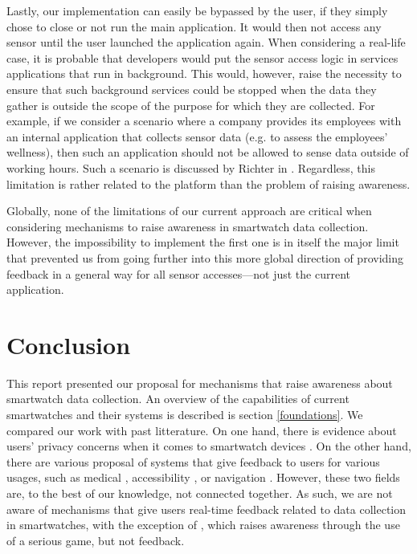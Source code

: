 \documentclass[conference, a4paper, 10pt, twocolumn]{IEEEtran}
\begin{document}
Lastly, our implementation can easily be bypassed by the user, if they simply chose to close or not run the main application. It would then not access any sensor until the user launched the application again. When considering a real-life case, it is probable that developers would put the sensor access logic in services applications that run in background. This would, however, raise the necessity to ensure that such background services could be stopped when the data they gather is outside the scope of the purpose for which they are collected. For example, if we consider a scenario where a company provides its employees with an internal application that collects sensor data (e.g. to assess the employees' wellness), then such an application should not be allowed to sense data outside of working hours. Such a scenario is discussed by Richter in \cite{richter2020privacy}. Regardless, this limitation is rather related to the platform than the problem of raising awareness. 

Globally, none of the limitations of our current approach are critical when considering mechanisms to raise awareness in smartwatch data collection. However, the impossibility to implement the first one is in itself the major limit that prevented us from going further into this more global direction of providing feedback in a general way for all sensor accesses---not just the current application.

\section{Conclusion}\label{conclusion}
This report presented our proposal for mechanisms that raise awareness about smartwatch data collection. An overview of the capabilities of current smartwatches and their systems is described is section \ref{foundations}. We compared our work with past litterature. On one hand, there is evidence about users' privacy concerns when it comes to smartwatch devices \cite{udoh2016privacy,datta2018survey,motti2015users}. On the other hand, there are various proposal of systems that give feedback to users for various usages, such as medical \cite{lee2019smartwatch}, accessibility \cite{goodman2020evaluating}, or navigation \cite{dobbelstein2016unconstrained}. However, these two fields are, to the best of our knowledge, not connected together. As such, we are not aware of mechanisms that give users real-time feedback related to data collection in smartwatches, with the exception of \cite{williams2019smart}, which raises awareness through the use of a serious game, but not feedback. 
\end{document}
